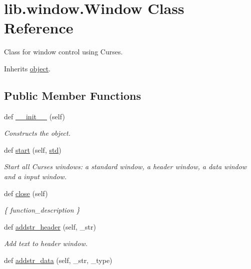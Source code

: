 \hypertarget{classlib_1_1window_1_1_window}{}\section{lib.\+window.\+Window Class Reference}
\label{classlib_1_1window_1_1_window}


Class for window control using Curses.  




Inherits \hyperlink{classobject}{object}.

\subsection*{Public Member Functions}
\begin{DoxyCompactItemize}
\item 
def \hyperlink{classlib_1_1window_1_1_window_ad1dc79017b0ccc059db34a9c25acd989}{\+\_\+\+\_\+init\+\_\+\+\_\+} (self)
\begin{DoxyCompactList}\small\item\em Constructs the object. \end{DoxyCompactList}\item 
def \hyperlink{classlib_1_1window_1_1_window_a389bc9bf90590f81625076f0aeacba10}{start} (self, \hyperlink{classlib_1_1window_1_1_window_a9b20669f15ee40985bd201e54984bf7f}{std})
\begin{DoxyCompactList}\small\item\em Start all Curses windows\+: a standard window, a header window, a data window and a input window. \end{DoxyCompactList}\item 
def \hyperlink{classlib_1_1window_1_1_window_a8e231b24713f4cac4a6f0110356758da}{close} (self)
\begin{DoxyCompactList}\small\item\em \{ function\+\_\+description \} \end{DoxyCompactList}\item 
def \hyperlink{classlib_1_1window_1_1_window_ac2f7ed04407c2581493432ff28f82558}{addstr\+\_\+header} (self, \+\_\+str)
\begin{DoxyCompactList}\small\item\em Add text to header window. \end{DoxyCompactList}\item 
def \hyperlink{classlib_1_1window_1_1_window_a893dd9f303b6e33d0e47356455b6d58d}{addstr\+\_\+data} (self, \+\_\+str, \+\_\+type)

\end{DoxyCompactItemize}
